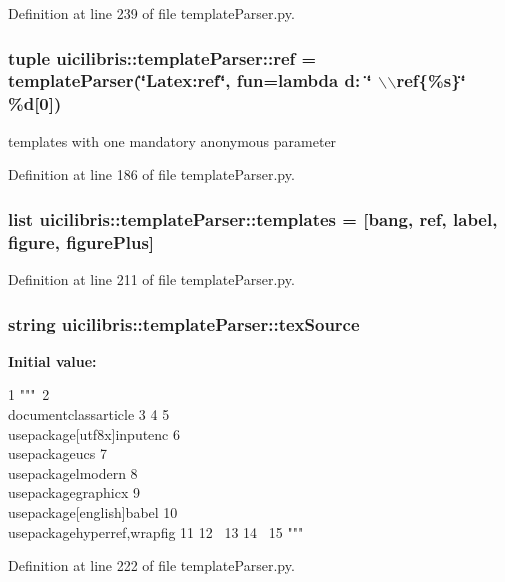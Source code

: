 \-Definition at line 239 of file template\-Parser.\-py.

\hypertarget{namespaceuicilibris_1_1templateParser_ad641a7d51cf16935ac4a7912f8cca790}{
\subsubsection[{ref}]{\setlength{\rightskip}{0pt plus 5cm}tuple {\bf uicilibris\-::template\-Parser\-::ref} = {\bf template\-Parser}(\char`\"{}\-Latex\-:ref\char`\"{}, fun=lambda d\-: \char`\"{} $\backslash$$\backslash$ref\{\%s\}\char`\"{} \%d\mbox{[}0\mbox{]})}}\label{namespaceuicilibris_1_1templateParser_ad641a7d51cf16935ac4a7912f8cca790}


templates with one mandatory anonymous parameter 



\-Definition at line 186 of file template\-Parser.\-py.

\hypertarget{namespaceuicilibris_1_1templateParser_ad7d8a741383be26743e20995ca1fefb5}{
\subsubsection[{templates}]{\setlength{\rightskip}{0pt plus 5cm}list {\bf uicilibris\-::template\-Parser\-::templates} = \mbox{[}{\bf bang}, {\bf ref}, {\bf label}, {\bf figure}, figure\-Plus\mbox{]}}}\label{namespaceuicilibris_1_1templateParser_ad7d8a741383be26743e20995ca1fefb5}


\-Definition at line 211 of file template\-Parser.\-py.

\hypertarget{namespaceuicilibris_1_1templateParser_a1f958fca9ba00cb5d34e5912c7627b0b}{
\subsubsection[{tex\-Source}]{\setlength{\rightskip}{0pt plus 5cm}string {\bf uicilibris\-::template\-Parser\-::tex\-Source}}}\label{namespaceuicilibris_1_1templateParser_a1f958fca9ba00cb5d34e5912c7627b0b}
{\bfseries \-Initial value\-:}
\begin{DoxyCode}
1 """\
2 \\documentclass{article}
3 %
4 
5 \\usepackage[utf8x]{inputenc}
6 \\usepackage{ucs}
7 \\usepackage{lmodern}
8 \\usepackage{graphicx}
9 \\usepackage[english]{babel}
10 \\usepackage{hyperref,wrapfig}
11 
12 \
13 %
14 \
15 """
\end{DoxyCode}


\-Definition at line 222 of file template\-Parser.\-py.

